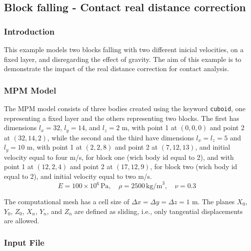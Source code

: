 \subsection{Block falling - Contact real distance correction}
\label{sec:block_falling_contact_example}

\subsubsection*{Introduction}

This example models two blocks falling with two different inicial velocities, on a fixed layer, and disregarding the effect of gravity. 
The aim of this example is to demonstrate the impact of the real distance correction for contact analysis.

\subsubsection*{MPM Model}

The MPM model consists of three bodies created using the keyword \texttt{cuboid}, one representing a fixed layer and the others representing two blocks. 
The first has dimensions $l_x = 32$, $l_y = 14$, and $l_z = 2$ m, with point 1 at $(0,0,0)$ and point 2 at $(32, 14, 2)$, 
while the second and the third have dimensions $l_x = l_z = 5$ and $l_y = 10$ m, with point 1 at $(2,2,8)$ and point 2 at $(7, 12, 13)$, and initial velocity equal to four m/s, for block one (wich body id equal to 2),
and with point 1 at $(12,2,4)$ and point 2 at $(17, 12, 9)$, for block two (wich body id equal to 2), and initial velocity equal to two m/s. 
\[
E = 100 \times 10^6\,\text{Pa}, \quad \rho = 2500\,\text{kg/m}^3, \quad \nu = 0.3
\]

The computational mesh has a cell size of $\Delta x = \Delta y = \Delta z = 1$ m. 
The planes $X_0$, $Y_0$, $Z_0$, $X_n$, $Y_n$, and $Z_n$ are defined as sliding, i.e., only tangential displacements are allowed.

\subsubsection*{Input File}

